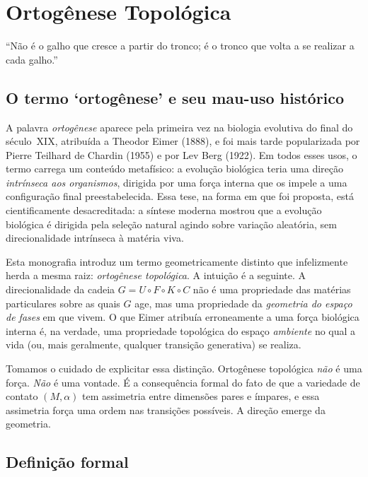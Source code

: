 \documentclass[12pt,a4paper,twoside]{book}
\theoremstyle{plain}
\theoremstyle{definition}
\theoremstyle{definition}
\begin{document}
\chapter{Ortogênese Topológica}
\label{cap:ortogenese}

\epigraph{``Não é o galho que cresce a partir do tronco; é o tronco que
volta a se realizar a cada galho.''}{}

\section{O termo `ortogênese' e seu mau-uso histórico}

A palavra \emph{ortogênese} aparece pela primeira vez na biologia
evolutiva do final do século~XIX, atribuída a Theodor Eimer (1888),
e foi mais tarde popularizada por Pierre Teilhard de Chardin (1955) e por
Lev Berg (1922). Em todos esses usos, o termo carrega um conteúdo
metafísico: a evolução biológica teria uma direção \emph{intrínseca aos
organismos}, dirigida por uma força interna que os impele a uma
configuração final preestabelecida. Essa tese, na forma em que foi
proposta, está cientificamente desacreditada: a síntese moderna mostrou
que a evolução biológica é dirigida pela seleção natural agindo sobre
variação aleatória, sem direcionalidade intrínseca à matéria viva.

Esta monografia introduz um termo geometricamente distinto que infelizmente
herda a mesma raiz: \emph{ortogênese topológica}. A intuição é a seguinte.
A direcionalidade da cadeia $G = U \circ F \circ K \circ C$ não é uma
propriedade das matérias particulares sobre as quais $G$ age, mas uma
propriedade da \emph{geometria do espaço de fases} em que vivem. O que
Eimer atribuía erroneamente a uma força biológica interna é, na verdade,
uma propriedade topológica do espaço \emph{ambiente} no qual a vida (ou,
mais geralmente, qualquer transição generativa) se realiza.

Tomamos o cuidado de explicitar essa distinção. Ortogênese topológica
\emph{não} é uma força. \emph{Não} é uma vontade. É a consequência formal
do fato de que a variedade de contato $(M,\alpha)$ tem assimetria entre
dimensões pares e ímpares, e essa assimetria força uma ordem nas
transições possíveis. A direção emerge da geometria.

\section{Definição formal}
\end{document}
